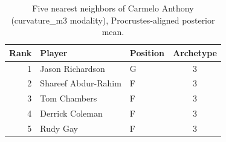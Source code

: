 \begin{table}[htbp]
  \centering\small
  \begin{tabular}{rllc}
    \toprule
    Rank & Player & Position & Archetype \\
    \midrule
    1 & Jason Richardson & G & 3 \\
    2 & Shareef Abdur-Rahim & F & 3 \\
    3 & Tom Chambers & F & 3 \\
    4 & Derrick Coleman & F & 3 \\
    5 & Rudy Gay & F & 3 \\
    \bottomrule
  \end{tabular}
  \caption{Five nearest neighbors of Carmelo Anthony (curvature_m3 modality), Procrustes-aligned posterior mean.}
  \label{tab:Carmelo_Anthony_neighbors_curvature_m3}
\end{table}

